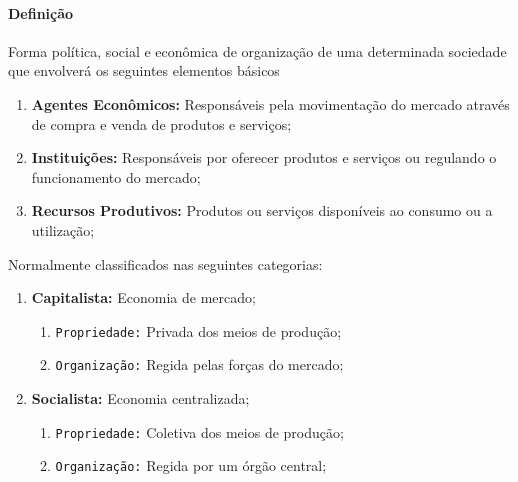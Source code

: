 \documentclass{article}
\begin{document}
            \paragraph{Definição}Forma política, social e econômica de organização de uma determinada sociedade que envolverá os seguintes elementos básicos
                \begin{enumerate}[noitemsep, rightmargin = \leftmargin]
                    \item \textbf{Agentes Econômicos:} Responsáveis pela movimentação do mercado através de compra e venda de produtos e serviços;

                    \item \textbf{Instituições:} Responsáveis por oferecer produtos e serviços ou regulando o funcionamento do mercado;

                    \item \textbf{Recursos Produtivos:} Produtos ou serviços disponíveis ao consumo ou a utilização;
                \end{enumerate}
            Normalmente classificados nas seguintes categorias:
                \begin{multicols}{2}
                    \begin{enumerate}[rightmargin = \leftmargin]
                        \item \textbf{Capitalista:} Economia de mercado;
                            \begin{enumerate}[noitemsep]
                                \item \texttt{Propriedade:} Privada dos meios de produção;
                                \item \texttt{Organização:} Regida pelas forças do mercado;
                            \end{enumerate}

                        \columnbreak

                        \item \textbf{Socialista:} Economia centralizada;
                            \begin{enumerate}[noitemsep]
                                \item \texttt{Propriedade:} Coletiva dos meios de produção;
                                \item \texttt{Organização:} Regida por um órgão central;
                            \end{enumerate}
                    \end{enumerate}
                \end{multicols}
\end{document}
